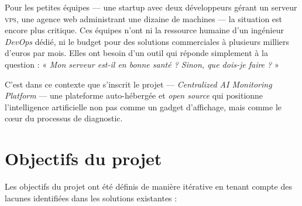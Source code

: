 Pour les petites équipes --- une startup avec deux développeurs gérant un serveur
\textsc{vps}, une agence web administrant une dizaine de machines --- la situation
est encore plus critique. Ces équipes n'ont ni la ressource humaine d'un ingénieur
\textit{DevOps} dédié, ni le budget pour des solutions commerciales à plusieurs
milliers d'euros par mois. Elles ont besoin d'un outil qui réponde simplement à
la question : « \textit{Mon serveur est-il en bonne santé ? Sinon, que dois-je
faire ?} »

C'est dans ce contexte que s'inscrit le projet \textbf{\caimp{}} ---
\textit{Centralized AI Monitoring Platform} --- une plateforme auto-hébergée
et \textit{open source} qui positionne l'intelligence artificielle non pas comme
un gadget d'affichage, mais comme le cœur du processus de diagnostic.

\section{Objectifs du projet}

Les objectifs du projet \caimp{} ont été définis de manière itérative en tenant
compte des lacunes identifiées dans les solutions existantes :

